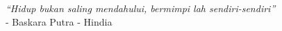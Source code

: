 \clearpage
{}%

\begin{Center}
	\centering \textit{“Hidup bukan saling mendahului, bermimpi lah sendiri-sendiri”}\\
	- Baskara Putra - Hindia
\end{Center}
 
\clearpage